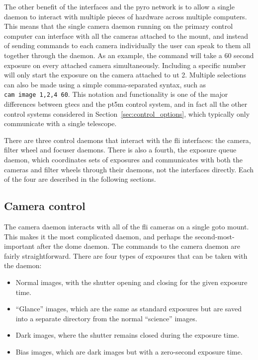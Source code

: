 \begin{colsection}
\begin{colsection}
The other benefit of the interfaces and the \gls{pyro} network is to allow a single daemon to interact with multiple pieces of hardware across multiple computers. This means that the single camera daemon running on the primary control computer can interface with all the cameras attached to the mount, and instead of sending commands to each camera individually the user can speak to them all together through the daemon. As an example, the command  will take a 60 second exposure on every attached camera simultaneously. Including a specific number  will only start the exposure on the camera attached to \gls{ut} 2. Multiple selections can also be made using a simple comma-separated syntax, such as \texttt{cam~image~1,2,4~60}. This notation and functionality is one of the major differences between \gls{gtecs} and the \gls{pt5m} control system, and in fact all the other control systems considered in Section~\ref{sec:control_options}, which typically only communicate with a single telescope.

There are three control daemons that interact with the \gls{fli} interfaces: the camera, filter wheel and focuser daemons. There is also a fourth, the exposure queue daemon, which coordinates sets of exposures and communicates with both the cameras and filter wheels through their daemons, not the interfaces directly. Each of the four are described in the following sections.

\end{colsection}


\subsection{Camera control}
\label{sec:cam}
\begin{colsection}

The camera daemon interacts with all of the \gls{fli} cameras on a single \gls{goto} mount. This makes it the most complicated daemon, and perhaps the second-most-important after the dome daemon. The commands to the camera daemon are fairly straightforward. There are four types of exposures that can be taken with the daemon:

\begin{itemize}
    \item Normal images, with the shutter opening and closing for the given exposure time.
    \item ``Glance'' images, which are the same as standard exposures but are saved into a separate directory from the normal ``science'' images.
    \item Dark images, where the shutter remains closed during the exposure time.
    \item Bias images, which are dark images but with a zero-second exposure time.
\end{itemize}


\end{colsection}
\end{colsection}
